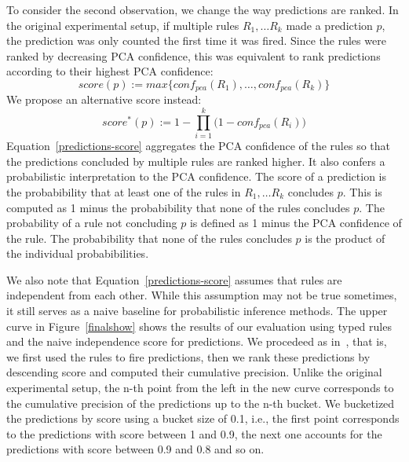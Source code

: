 To consider the second observation, we change the way predictions are ranked. In the original experimental setup, if 
multiple rules $R_1, \dots R_k$ made a prediction $p$, the prediction was only counted the first time it was fired. 
Since the rules were ranked by decreasing PCA confidence, 
this was equivalent to rank predictions according to their highest PCA confidence: 
\[
 score(p) := max\{conf_{pca}(R_1), \dots, conf_{pca}(R_k) \}
\]
We propose an alternative score instead:
\begin{equation}\label{predictions-score}
 score^*(p) := 1 - \prod_{i = 1}^{k}{(1 -conf_{pca}(R_i)})
\end{equation}
Equation~\ref{predictions-score} aggregates the PCA confidence of the rules so that the predictions concluded by multiple rules
are ranked higher. It also confers a probabilistic interpretation to the PCA confidence. The score of a prediction 
is the probabibility that at least one of the rules in $R_1, \dots R_k$ concludes $p$. This is computed as 1 minus the probabibility
that none of the rules concludes $p$. The probability of a rule not concluding $p$ is defined as 1 minus the PCA confidence of the rule.
The probabibility that none of the rules concludes $p$ is the product of the individual probabibilities.

We also note that Equation~\ref{predictions-score} assumes that rules are independent from each other. While this assumption may not be true sometimes, 
it still serves as a naive baseline for probabilistic inference methods. The upper curve in Figure~\ref{finalshow} shows the results
of our evaluation using typed rules and the naive independence score for predictions. We procedeed as in~\cite{amie}, that is,
we first used the rules to fire predictions, then we rank these predictions by descending score and computed their cumulative precision. 
Unlike the original experimental setup, the n-th point from the left in the new curve corresponds to the cumulative precision
of the predictions up to the n-th bucket. We bucketized the predictions by score using a bucket size of 0.1, i.e., the first point
corresponds to the predictions with score between 1 and 0.9, the next one accounts for the predictions with score between 0.9 and 0.8 and so on.

